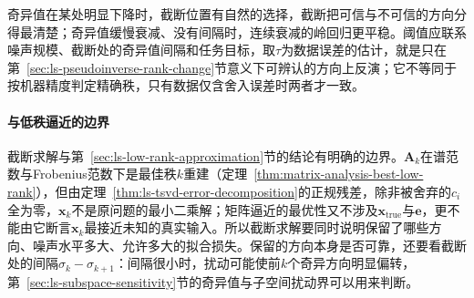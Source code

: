 奇异值在某处明显下降时，截断位置有自然的选择，截断把可信与不可信的方向分得最清楚；奇异值缓慢衰减、没有间隔时，连续衰减的岭回归更平稳。阈值应联系噪声规模、截断处的奇异值间隔和任务目标，取$\tau$为数据误差的估计，就是只在第~\ref{sec:ls-pseudoinverse-rank-change}节意义下可辨认的方向上反演；它不等同于按机器精度判定精确秩，只有数据仅含舍入误差时两者才一致。

\paragraph{与低秩逼近的边界}
截断求解与第~\ref{sec:ls-low-rank-approximation}节的结论有明确的边界。$\bm A_k$在谱范数与Frobenius范数下是最佳秩$k$重建（定理~\ref{thm:matrix-analysis-best-low-rank}），但由定理~\ref{thm:ls-tsvd-error-decomposition}的正规残差，除非被舍弃的$c_i$全为零，$\bm x_k$不是原问题的最小二乘解；矩阵逼近的最优性又不涉及$\bm x_{\mathrm{true}}$与$\bm e$，更不能由它断言$\bm x_k$最接近未知的真实输入。所以截断求解要同时说明保留了哪些方向、噪声水平多大、允许多大的拟合损失。保留的方向本身是否可靠，还要看截断处的间隔$\sigma_k-\sigma_{k+1}$：间隔很小时，扰动可能使前$k$个奇异方向明显偏转，第~\ref{sec:ls-subspace-sensitivity}节的奇异值与子空间扰动界可以用来判断。
